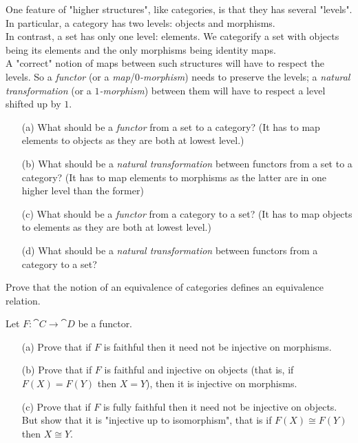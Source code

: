 \begin{problem}\label{prob 3.1b}
One feature of "higher structures", like categories, is that they has several "levels". In particular, a category has two levels: objects and morphisms.\\[0.5em]
In contrast, a set has only one level: elements. We categorify a set with objects being its elements and the only morphisms being identity maps.\\[0.5em]
A "correct" notion of maps between such structures will have to respect the levels. So a \emph{functor} (or a \emph{map}/\emph{$0$-morphism}) needs to preserve the levels; a \emph{natural transformation} (or a \emph{$1$-morphism}) between them will have to respect a level shifted up by $1$.
\begin{itemize}
\item[(a)] What should be a \emph{functor} from a set to a category? (It has to map elements to objects as they are both at lowest level.)
\item[(b)] What should be a \emph{natural transformation} between functors from a set to a category? (It has to map elements to morphisms as the latter are in one higher level than the former)
\item[(c)] What should be a \emph{functor} from a category to a set? (It has to map objects to elements as they are both at lowest level.)
\item[(d)] What should be a \emph{natural transformation} between functors from a category to a set?
\end{itemize}
\end{problem}

\vspace{0.1in}

\begin{problem}\label{prob 3.2}
Prove that the notion of an equivalence of categories defines an equivalence relation.
\end{problem}

\vspace{0.1in}

\begin{problem}\label{prob 3.3}
Let $F:\cat{C} \to \cat{D}$ be a functor.
\begin{itemize}
\item[(a)] Prove that if $F$ is faithful then it need not be injective on morphisms.
\item[(b)] Prove that if $F$ is faithful and injective on objects (that is, if $F(X) = F(Y)$ then $X = Y$), then it is injective on morphisms.
\item[(c)] Prove that if $F$ is fully faithful then it need not be injective on objects. But show that it is "injective up to isomorphism", that is if $F(X) \cong F(Y)$ then $X \cong Y$.
\end{itemize}
\end{problem}

